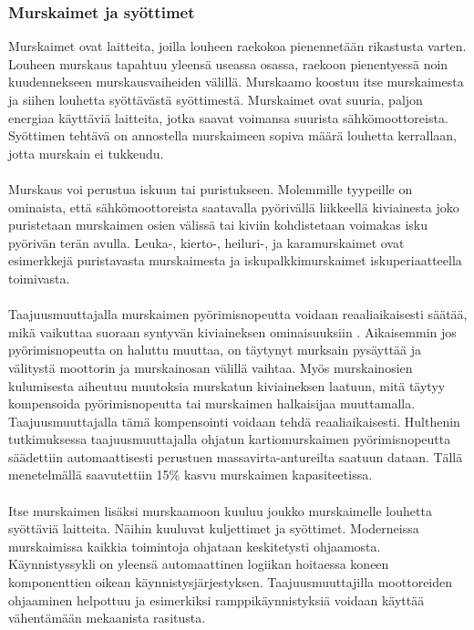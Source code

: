 \documentclass[finnish,12pt,a4paper,pdftex,elec,utf8]{aaltothesis}
\begin{document}
\subsubsection{Murskaimet ja syöttimet} %
Murskaimet ovat laitteita, joilla louheen raekokoa pienennetään rikastusta varten. Louheen murskaus tapahtuu yleensä useassa osassa, raekoon pienentyessä noin kuudennekseen murskausvaiheiden välillä. Murskaamo koostuu itse murskaimesta ja siihen louhetta syöttävästä syöttimestä. Murskaimet ovat suuria, paljon energiaa käyttäviä laitteita, jotka saavat voimansa suurista sähkömoottoreista. Syöttimen tehtävä on annostella murskaimeen sopiva määrä louhetta kerrallaan, jotta murskain ei tukkeudu.
\\\\
Murskaus voi perustua iskuun tai puristukseen. Molemmille tyypeille on ominaista, että sähkömoottoreista saatavalla pyörivällä liikkeellä kiviainesta joko puristetaan murskaimen osien välissä tai kiviin kohdistetaan voimakas isku pyörivän terän avulla. Leuka-, kierto-, heiluri-, ja karamurskaimet ovat esimerkkejä puristavasta murskaimesta ja iskupalkkimurskaimet iskuperiaatteella toimivasta.
\\\\
Taajuusmuuttajalla murskaimen pyörimisnopeutta voidaan reaaliaikaisesti säätää, mikä vaikuttaa suoraan syntyvän kiviaineksen ominaisuuksiin \cite{Hulthen}. Aikaisemmin jos pyörimisnopeutta on haluttu muuttaa, on täytynyt murksain pysäyttää ja välitystä moottorin ja murskainosan välillä vaihtaa. Myös murskainosien kulumisesta aiheutuu muutoksia murskatun kiviaineksen laatuun, mitä täytyy kompensoida pyörimisnopeutta tai murskaimen halkaisijaa muuttamalla. Taajuusmuuttajalla tämä kompensointi voidaan tehdä reaaliaikaisesti. Hulthenin tutkimuksessa \cite{Hulthen} taajuusmuuttajalla ohjatun kartiomurskaimen pyörimisnopeutta säädettiin automaattisesti perustuen massavirta-antureilta saatuun dataan. Tällä menetelmällä saavutettiin 15\% kasvu murskaimen kapasiteetissa.
\\\\
Itse murskaimen lisäksi murskaamoon kuuluu joukko murskaimelle louhetta syöttäviä laitteita. Näihin kuuluvat kuljettimet ja syöttimet. Moderneissa murskaimissa kaikkia toimintoja ohjataan keskitetysti ohjaamosta. Käynnistyssykli on yleensä automaattinen logiikan hoitaessa koneen komponenttien oikean käynnistysjärjestyksen. Taajuusmuuttajilla moottoreiden ohjaaminen helpottuu ja esimerkiksi ramppikäynnistyksiä voidaan käyttää vähentämään mekaanista rasitusta.
\end{document}
